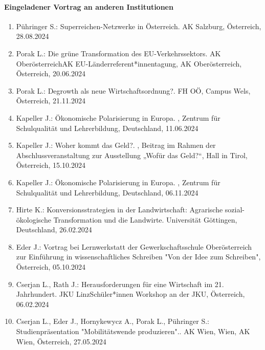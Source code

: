 \paragraph{Eingeladener Vortrag an anderen Institutionen}
\begin{enumerate}
	\item Pühringer S.: Superreichen-Netzwerke in Österreich. AK Salzburg, Österreich, 28.08.2024
	\item Porak L.: Die grüne Transformation des EU-Verkehrssektors. AK OberösterreichAK EU-Länderreferent*innentagung, AK Oberösterreich, Österreich, 20.06.2024
	\item Porak L.: Degrowth als neue Wirtschaftsordnung?. FH OÖ, Campus Wels, Österreich, 21.11.2024
	\item Kapeller J.: Ökonomische Polarisierung in Europa. , Zentrum für Schulqualität und Lehrerbildung, Deutschland, 11.06.2024
	\item Kapeller J.: Woher kommt das Geld?. , Beitrag im Rahmen der Abschlussveranstaltung zur Ausstellung „Wofür das Geld?“, Hall in Tirol, Österreich, 15.10.2024
	\item Kapeller J.: Ökonomische Polarisierung in Europa. , Zentrum für Schulqualität und Lehrerbildung, Deutschland, 06.11.2024
	\item Hirte K.: Konversionsstrategien in der Landwirtschaft: Agrarische sozial-ökologische Transformation und die Landwirte. Universität Göttingen, Deutschland, 26.02.2024
	\item Eder J.: Vortrag bei Lernwerkstatt der Gewerkschaftsschule Oberösterreich zur Einführung in wissenschaftliches Schreiben "Von der Idee zum Schreiben", Österreich, 05.10.2024
	\item Cserjan L., Rath J.: Herausforderungen für eine Wirtschaft im 21. Jahrhundert. JKU LinzSchüler*innen Workshop an der JKU, Österreich, 06.02.2024
	\item Cserjan L., Eder J., Hornykewycz A., Porak L., Pühringer S.: Studienpräsentation "Mobilitätswende produzieren".. AK Wien, Wien, AK Wien, Österreich, 27.05.2024
\end{enumerate}
